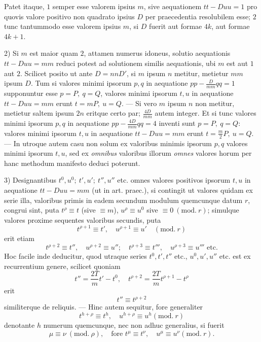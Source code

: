 Patet itaque, \(1\) semper esse valorem ipsius \(m\), sive aequationem \(tt-Duu=1\) pro quovis valore positivo non quadrato ipsius \(D\) per praecedentia resolubilem esse; \(2\) tunc tantummodo esse valorem ipsius \(m\), si \(D\) fuerit aut formae \(4k\), aut formae \(4k+1\).

2) Si \(m\) est maior quam \(2\), attamen numerus idoneus, solutio aequationis \(tt-Duu=mm\) reduci potest ad solutionem similis aequationis, ubi \(m\) est aut \(1\) aut \(2\). Scilicet posito ut ante \(D=nnD'\), si \(m\) ipsum \(n\) metitur, metietur \(mm\) ipsum \(D\). Tum si valores minimi ipsorum \(p,q\) in aequatione \(pp-\frac{D}{mm}qq=1\) supponuntur esse \(p=P,\ q=Q\), valores minimi ipsorum \(t,u\) in aequatione \(tt-Duu=mm\) erunt \(t=mP,\ u=Q\). --- Si vero \(m\) ipsum \(n\) non metitur, metietur saltem ipsum \(2n\) eritque certo par; \(\frac{4D}{mm}\) autem integer. Et si tunc valores minimi ipsorum \(p,q\) in aequatione \(pp-\frac{4D}{mm}qq=4\) inventi sunt \(p=P,\ q=Q\): valores minimi ipsorum \(t,u\) in aequatione \(tt-Duu=mm\) erunt \(t=\frac{m}{2}P,\ u=Q\). --- In utroque autem casu non solum ex valoribus minimis ipsorum \(p,q\) valores minimi ipsorum \(t,u\), sed ex \textit{omnibus} valoribus illorum \textit{omnes} valores horum per hanc methodum manifesto deduci poterunt.

3) Designantibus \(t^0,u^0;\ t',u';\ t'',u''\) etc. omnes valores positivos ipsorum
\(t,u\) in aequatione \(tt-Duu=mm\) (ut in art. praec.), si contingit ut valores quidam ex serie illa, valoribus primis in eadem secundum modulum quemcunque datum \(r\), congrui sint, puta \(t^\rho\equiv t\) (sive \(\equiv m\)), \(u^\rho\equiv u^0\) sive \(\equiv0\ (\mathrm{mod.}\ r)\); simulque valores proxime sequentes valoribus secundis, puta
\[
t^{\rho+1}\equiv t',\quad u^{\rho+1}\equiv u'\quad(\mathrm{mod.}\ r)
\]
erit etiam
\[
t^{\rho+2}\equiv t'',\quad u^{\rho+2}\equiv u'';\quad t^{\rho+3}\equiv t''',\quad u^{\rho+3}\equiv u'''\text{ etc.}
\]
Hoc facile inde deducitur, quod utraque series \(t^0,t',t''\) etc., \(u^0,u',u''\) etc. est ex recurrentium genere, scilicet quoniam
\[
t''=\frac{2T}{m}t'-t^0,\quad t^{\rho+2}=\frac{2T}{m}t^{\rho+1}-t^\rho
\]
erit
\[
t''\equiv t^{\rho+2}
\]
similiterque de reliquis. --- Hinc autem sequitur, fore generaliter
\[
t^{h+\rho}\equiv t^h,\quad u^{h+\rho}\equiv u^h(\mathrm{mod.}\ r)
\]
denotante \(h\) numerum quemcunque, nec non adhuc generalius, si fuerit
\[
\mu\equiv\nu\ (\mathrm{mod.}\ \rho),\quad\text{fore }t^\mu\equiv t^\nu,\quad u^\mu\equiv u^\nu(\mathrm{mod.}\ r).
\]

